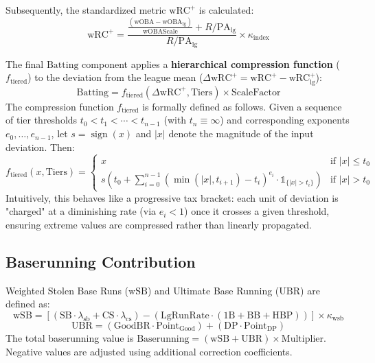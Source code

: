 \documentclass[uplatex,a4paper,11pt,dvipdfmx]{jsarticle}
\newcommand{\mvar}[1]{\mathrm{#1}}
\begin{document}
Subsequently, the standardized metric $\mvar{wRC}^+$ is calculated:
\begin{equation}
\mvar{wRC}^+ = \frac{\frac{(\mvar{wOBA} - \mvar{wOBA}_{\text{lg}})}{\mvar{wOBAScale}} + R/\mvar{PA}_{\text{lg}}}{R/\mvar{PA}_{\text{lg}}} \times \kappa_{\text{index}}
\end{equation}

The final $\mvar{Batting}$ component applies a \textbf{hierarchical compression function} ($f_{\text{tiered}}$) to the deviation from the league mean ($\Delta \mvar{wRC}^+ = \mvar{wRC}^+ - \mvar{wRC}^+_{\text{lg}}$):
\begin{equation}
\mvar{Batting} = f_{\text{tiered}}(\Delta \mvar{wRC}^+, \mvar{Tiers}) \times \mvar{ScaleFactor}
\end{equation}
The compression function $f_{\text{tiered}}$ is formally defined as follows. Given a sequence of tier thresholds $t_0 < t_1 < \cdots < t_{n-1}$ (with $t_n \equiv \infty$) and corresponding exponents $e_0, \ldots, e_{n-1}$, let $s = \operatorname{sign}(x)$ and $|x|$ denote the magnitude of the input deviation. Then:
\begin{equation}
f_{\text{tiered}}(x, \mvar{Tiers}) =
\begin{cases}
x & \text{if } |x| \le t_0 \\
s \left( t_0 + \displaystyle\sum_{i=0}^{n-1} \left(\min(|x|, t_{i+1}) - t_i\right)^{e_i} \cdot \mathbb{1}_{\{|x| > t_i\}} \right) & \text{if } |x| > t_0
\end{cases}
\end{equation}
Intuitively, this behaves like a progressive tax bracket: each unit of deviation is "charged" at a diminishing rate (via $e_i < 1$) once it crosses a given threshold, ensuring extreme values are compressed rather than linearly propagated.

\subsection{Baserunning Contribution}
Weighted Stolen Base Runs ($\mvar{wSB}$) and Ultimate Base Running ($\mvar{UBR}$) are defined as:
\begin{equation}
\mvar{wSB} = \left[ (\mvar{SB} \cdot \lambda_{\text{sb}} + \mvar{CS} \cdot \lambda_{\text{cs}}) - (\mvar{LgRunRate} \cdot (\mvar{1B} + \mvar{BB} + \mvar{HBP})) \right] \times \kappa_{\text{wsb}}
\end{equation}
\begin{equation}
\mvar{UBR} = (\mvar{GoodBR} \cdot \mvar{Point}_{\text{Good}}) + (\mvar{DP} \cdot \mvar{Point}_{\text{DP}})
\end{equation}
The total baserunning value is $\mvar{Baserunning} = (\mvar{wSB} + \mvar{UBR}) \times \mvar{Multiplier}$. Negative values are adjusted using additional correction coefficients.
\end{document}
